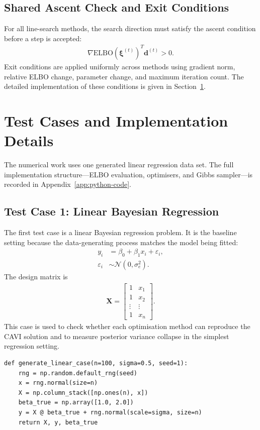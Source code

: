 \documentclass[11pt,a4paper]{article}
\newcommand{\N}{\mathcal{N}}
\newcommand{\ELBO}{\text{ELBO}}
\begin{document}
\subsection{Shared Ascent Check and Exit Conditions}

For all line-search methods, the search direction must satisfy the ascent condition before a step is accepted:
\begin{align}
\nabla\ELBO(\bm{\xi}^{(t)})^T\bm{d}^{(t)} > 0.
\end{align}
Exit conditions are applied uniformly across methods using gradient norm, relative ELBO change, parameter change, and maximum iteration count. The detailed implementation of these conditions is given in Section~\ref{sec:implementation-details}.

\section{Test Cases and Implementation Details}
\label{sec:implementation-details}

The numerical work uses one generated linear regression data set. The full implementation structure---ELBO evaluation, optimisers, and Gibbs sampler---is recorded in Appendix~\ref{app:python-code}.

\subsection{Test Case 1: Linear Bayesian Regression}

The first test case is a linear Bayesian regression problem. It is the baseline setting because the data-generating process matches the model being fitted:
\begin{align}
y_i &= \beta_0 + \beta_1 x_i + \varepsilon_i,\\
\varepsilon_i &\sim \N(0,\sigma_e^2).
\end{align}
The design matrix is
\begin{align}
\bm{X} =
\begin{bmatrix}
1 & x_1\\
1 & x_2\\
\vdots & \vdots\\
1 & x_n
\end{bmatrix}.
\end{align}
This case is used to check whether each optimisation method can reproduce the CAVI solution and to measure posterior variance collapse in the simplest regression setting.

\begin{verbatim}
def generate_linear_case(n=100, sigma=0.5, seed=1):
    rng = np.random.default_rng(seed)
    x = rng.normal(size=n)
    X = np.column_stack([np.ones(n), x])
    beta_true = np.array([1.0, 2.0])
    y = X @ beta_true + rng.normal(scale=sigma, size=n)
    return X, y, beta_true
\end{verbatim}
\end{document}
